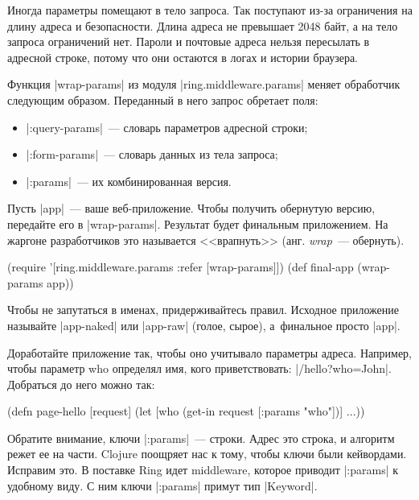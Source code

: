 Иногда параметры помещают в тело запроса. Так поступают из-за ограничения на
длину адреса и безопасности. Длина адреса не превышает 2048 байт, а на тело
запроса ограничений нет. Пароли и почтовые адреса нельзя пересылать в адресной
строке, потому что они остаются в логах и истории браузера.

Функция \spverb|wrap-params| из модуля \spverb|ring.middleware.params| меняет
обработчик следующим образом. Переданный в него запрос обретает поля:

\begin{itemize}

\item
  \spverb|:query-params|~--- словарь параметров адресной строки;

\item
  \spverb|:form-params|~--- словарь данных из тела запроса;

\item
  \spverb|:params|~--- их комбинированная версия.

\end{itemize}

Пусть \spverb|app|~--- ваше веб-приложение. Чтобы получить обернутую версию,
передайте его в \spverb|wrap-params|. Результат будет финальным приложением. На
жаргоне разработчиков это называется <<врапнуть>> (анг. \emph{wrap}~---
обернуть).

\begin{english}
  \begin{clojure}
(require '[ring.middleware.params :refer [wrap-params]])
(def final-app (wrap-params app))
  \end{clojure}
\end{english}

Чтобы не запутаться в именах, придерживайтесь правил. Исходное приложение
называйте \spverb|app-naked| или \spverb|app-raw| (голое, сырое), а~финальное
просто \spverb|app|.

Доработайте приложение так, чтобы оно учитывало параметры адреса. Например,
чтобы параметр who определял имя, кого приветствовать:
\spverb|/hello?who=John|. Добраться до него можно так:

\begin{english}
  \begin{clojure}
(defn page-hello [request]
  (let [who (get-in request [:params "who"])]
    ...))
  \end{clojure}
\end{english}

Обратите внимание, ключи \spverb|:params|~--- строки. Адрес это строка, и
алгоритм режет ее на части. Clojure поощряет нас к тому, чтобы ключи были
кейвордами. Исправим это. В поставке Ring идет middleware, которое приводит
\spverb|:params| к удобному виду. С ним ключи \spverb|:params| примут тип
\spverb|Keyword|.

